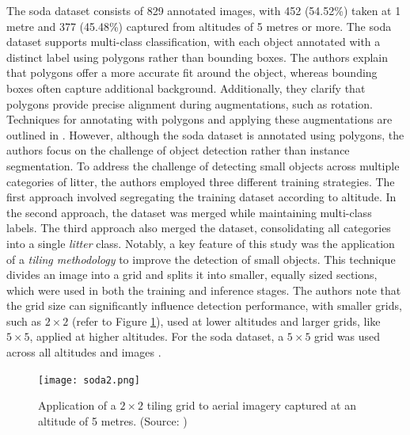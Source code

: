 The \gls{soda} dataset consists of 829 annotated images, with 452 (54.52\%) taken at 1 metre and 377 (45.48\%) captured from altitudes of 5 metres or more. 
The \gls{soda} dataset supports multi-class classification, with each object annotated with a distinct label using polygons rather than bounding boxes. The authors explain that polygons offer a more accurate fit around the object, whereas bounding boxes often capture additional background. Additionally, they clarify that polygons provide precise alignment during augmentations, such as rotation. Techniques for annotating with polygons and applying these augmentations are outlined in \cite{mask_to_annotation}. However, although the \gls{soda} dataset is annotated using polygons, the authors focus on the challenge of object detection rather than instance segmentation.
To address the challenge of detecting small objects across multiple categories of litter, the authors employed three different training strategies. The first approach involved segregating the training dataset according to altitude. In the second approach, the dataset was merged while maintaining multi-class labels. The third approach also merged the dataset, consolidating all categories into a single \textit{litter} class. 
Notably, a key feature of this study was the application of a \textit{tiling methodology} to improve the detection of small objects. This technique divides an image into a grid and splits it into smaller, equally sized sections, which were used in both the training and inference stages. The authors note that the grid size can significantly influence detection performance, with smaller grids, such as $2 \times 2$ (refer to Figure \ref{fig:soda2}), used at lower altitudes and larger grids, like $5 \times 5$, applied at higher altitudes. For the \gls{soda} dataset, a $5 \times 5$ grid was used across all altitudes and images \cite{detect_litter, soda_dataset, daniel_thesis}.

\begin{figure}[!htbp]
    \centering
    \texttt{[image: soda2.png]}
    \caption{Application of a $2 \times 2$ tiling grid to aerial imagery captured at an altitude of 5 metres. (Source: \cite{detect_litter})}
    \label{fig:soda2}
\end{figure}

